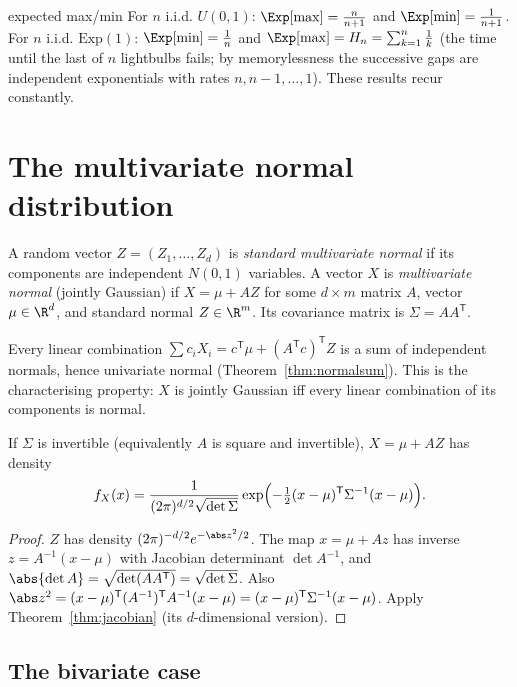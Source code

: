 \begin{interview}{expected max/min}
For $n$ i.i.d. $U(0,1)$: $\Exp[\max]=\frac n{n+1}$ and $\Exp[\min]=\frac1{n+1}$. For
$n$ i.i.d. $\mathrm{Exp}(1)$: $\Exp[\min]=\frac1n$ and
$\Exp[\max]=H_n=\sum_{k=1}^n\frac1k$ (the time until the last of $n$ lightbulbs
fails; by memorylessness the successive gaps are independent exponentials with
rates $n,n-1,\dots,1$). These results recur constantly.
\end{interview}

\section{The multivariate normal distribution}

\begin{definition}
A random vector $Z=(Z_1,\dots,Z_d)$ is \emph{standard multivariate normal} if its
components are independent $N(0,1)$ variables. A vector $X$ is \emph{multivariate
normal} (jointly Gaussian) if $X=\mu+AZ$ for some $d\times m$ matrix $A$, vector
$\mu\in\R^d$, and standard normal $Z\in\R^m$. Its covariance matrix is
$\Sigma=AA^{\mathsf T}$.
\end{definition}

Every linear combination $\sum c_iX_i=c^{\mathsf T}\mu+(A^{\mathsf T}c)^{\mathsf T}Z$
is a sum of independent normals, hence univariate normal (Theorem~\ref{thm:normalsum}).
This is the characterising property: $X$ is jointly Gaussian iff every linear
combination of its components is normal.

\begin{theorem}[Density]\label{thm:mvndensity}
If $\Sigma$ is invertible (equivalently $A$ is square and invertible), $X=\mu+AZ$ has
density
\[
f_X(x)=\frac1{(2\pi)^{d/2}\sqrt{\det\Sigma}}
\exp\Bigl(-\tfrac12(x-\mu)^{\mathsf T}\Sigma^{-1}(x-\mu)\Bigr).
\]
\end{theorem}
\begin{proof}
$Z$ has density $(2\pi)^{-d/2}e^{-\abs z^2/2}$. The map $x=\mu+Az$ has inverse
$z=A^{-1}(x-\mu)$ with Jacobian determinant $\det A^{-1}$, and
$\abs{\det A}=\sqrt{\det(AA^{\mathsf T})}=\sqrt{\det\Sigma}$. Also
$\abs z^2=(x-\mu)^{\mathsf T}(A^{-1})^{\mathsf T}A^{-1}(x-\mu)=(x-\mu)^{\mathsf T}\Sigma^{-1}(x-\mu)$.
Apply Theorem~\ref{thm:jacobian} (its $d$-dimensional version).
\end{proof}

\subsection*{The bivariate case}

